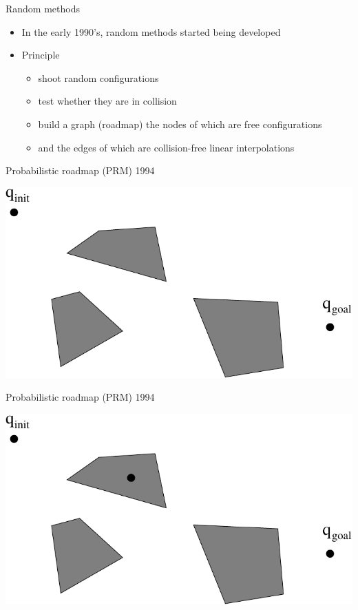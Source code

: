 
%
%

\begin{frame} {Random methods}
  \begin{itemize}
  \item In the early 1990's, random methods started being developed
    \pause
  \item Principle
    \begin{itemize}
    \item shoot random configurations
      \pause
    \item test whether they are in collision
      \pause
    \item build a graph (roadmap)  the nodes of which are free configurations
      \pause
    \item  and the edges of which are collision-free linear interpolations
    \end{itemize}
  \end{itemize}
\end{frame}

%
%

\begin{frame} {Probabilistic roadmap (PRM) 1994}
\centerline {
  \includegraphics[width=.8\linewidth]{figures/PRM1.pdf}
}
\end{frame}

\begin{frame} {Probabilistic roadmap (PRM) 1994}
\centerline {
  \includegraphics[width=.8\linewidth]{figures/PRM2.pdf}
}
\end{frame}

